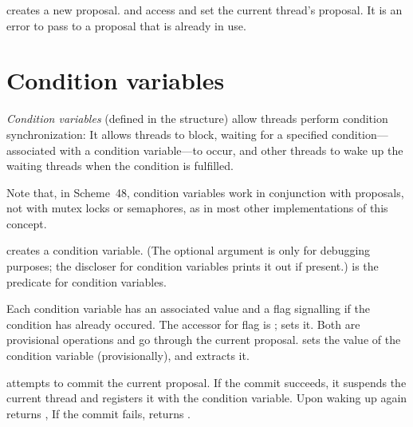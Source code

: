  creates a new proposal.
 and  access and set
 the current thread's proposal.
It is an error to pass to  a proposal that
 is already in use.


\section{Condition variables}

\textit{Condition variables} (defined in the 
structure) allow threads perform condition synchronization: It allows
threads to block, waiting for a specified condition---associated with a
condition variable---to occur, and other threads to wake up the waiting
threads when the condition is fulfilled.

Note that, in Scheme~48, condition variables work in conjunction with
proposals, not with mutex locks or semaphores, as in most other
implementations of this concept.

\begin{protos}
\end{protos}
%
 creates a condition variable.  (The optional
 argument is only for debugging purposes; the discloser for
condition variables prints it out if present.)   is the
predicate for condition variables.

Each condition variable has an associated value and a flag
 signalling if the condition has already occured.
The accessor for flag is ;
 sets it.  Both are provisional
operations and go through the current proposal.
 sets the value of the condition variable
(provisionally), and  extracts it.

 attempts to commit the
current proposal.  If the commit succeeds, it suspends the current
thread and registers it with the  condition variable.
Upon waking up again  returns
, If the commit fails, 
returns .

